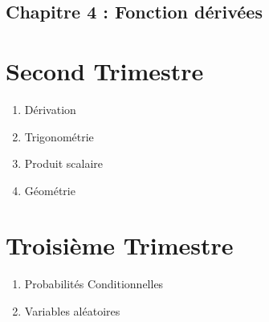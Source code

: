 \documentclass{article}
\begin{document}
\subsection*{Chapitre 4 : Fonction dérivées}
\section{Second Trimestre}
\begin{enumerate}[resume]
\item Dérivation
\item Trigonométrie
\item Produit scalaire
\item Géométrie
\end{enumerate}
\section{Troisième Trimestre}
\begin{enumerate}[resume]
\item Probabilités Conditionnelles
\item Variables aléatoires
\end{enumerate}
\end{document}
